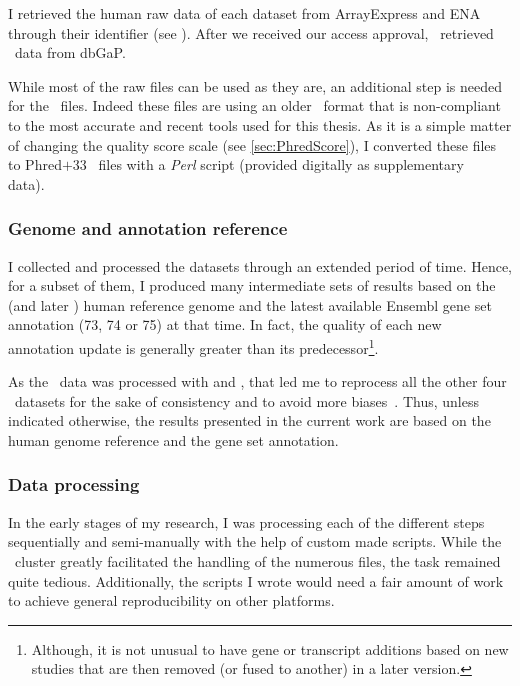 I retrieved the human raw data of each dataset from \gls{ArrayExpress} and
\gls{ENA} through their identifier (see ). After we
received our access approval, \nuno\ retrieved \Gtex\ data from
\gls{dbGaP}.\mybr\

While most of the raw files can be used as they are, an additional step is
needed for the \castle\ files. Indeed these files are using an older
\fastq\ format that is non-compliant to the most accurate and recent tools used
for this thesis.
As it is a simple matter of changing the quality score scale
(see \cref{sec:PhredScore}),
I converted these files to \gls{Phred}$+33$ \fastq\ files with a
\emph{\gls{Perl}} script (provided digitally as supplementary data).\mybr\

\subsubsection{Genome and annotation reference}

I collected and processed the datasets through an extended period of time.
Hence, for a subset of them,
I produced many intermediate sets of results based on the 
(and later ) human reference genome and the latest available
\gls{Ensembl} gene set annotation (73, 74 or 75) at that time.
In fact, the quality of each new annotation update is
generally greater than its predecessor\footnote{Although,
it is not unusual to have gene or transcript additions based on new studies
that are then removed (or fused to another) in a later version.
}.\mybr\

As the \gtex\ data was processed with  and , that led me
to reprocess all the other four \Rnaseq\ datasets for the sake of consistency and
to avoid more biases~. Thus, unless indicated
otherwise, the results presented in the current work are
based on the  human genome reference and the  gene set annotation.\mybr\


\subsubsection{Data processing}\label{subsubsec:RnaseqDataProc}

In the early stages of my research, I was processing each of the different steps
sequentially and semi-manually with the help of custom made scripts. While the
\EBI\ \gls{cluster} greatly facilitated the handling of the numerous files,
the task remained quite tedious.
Additionally,
the scripts I wrote would need a fair amount of work to achieve general
reproducibility on other platforms.\mybr\

